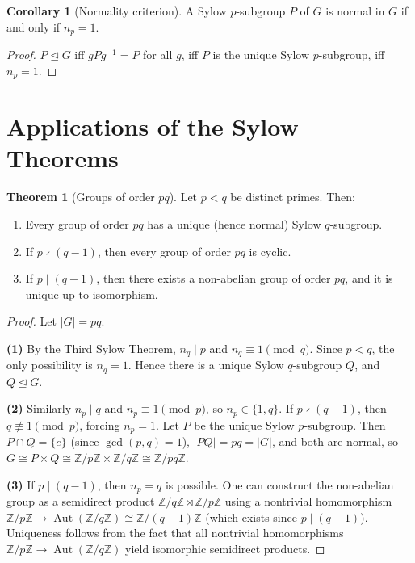 \documentclass[12pt,a4paper,openany]{book}
\theoremstyle{definition}
\newtheorem{theorem}{Theorem}[chapter]
\newtheorem{corollary}{Corollary}[chapter]
\theoremstyle{remark}
\newcommand{\Z}{\mathbb{Z}}
\DeclareMathOperator{\Aut}{Aut}
\renewcommand{\gcd}{\operatorname{gcd}}
\begin{document}
\begin{corollary}[Normality criterion]\label{cor:sylow-normal}
A Sylow $p$-subgroup $P$ of $G$ is normal in $G$ if and only if
$n_p=1$.
\end{corollary}

\begin{proof}
$P\trianglelefteq G$ iff $gPg^{-1}=P$ for all $g$, iff $P$ is the
unique Sylow $p$-subgroup, iff $n_p=1$.
\end{proof}

\section{Applications of the Sylow Theorems}\label{sec:sylow-applications}

\begin{theorem}[Groups of order $pq$]\label{thm:order-pq}
Let $p<q$ be distinct primes.  Then:
\begin{enumerate}
\item Every group of order $pq$ has a unique (hence normal) Sylow
      $q$-subgroup.
\item If $p\nmid(q-1)$, then every group of order $pq$ is cyclic.
\item If $p\mid(q-1)$, then there exists a non-abelian group of
      order $pq$, and it is unique up to isomorphism.
\end{enumerate}
\end{theorem}

\begin{proof}
Let $|G|=pq$.

\textbf{(1)}  By the Third Sylow Theorem, $n_q\mid p$ and
$n_q\equiv 1\pmod{q}$.  Since $p<q$, the only possibility is
$n_q=1$.  Hence there is a unique Sylow $q$-subgroup $Q$, and
$Q\trianglelefteq G$.

\textbf{(2)}  Similarly $n_p\mid q$ and $n_p\equiv 1\pmod{p}$, so
$n_p\in\{1,q\}$.  If $p\nmid(q-1)$, then $q\not\equiv 1\pmod{p}$,
forcing $n_p=1$.  Let $P$ be the unique Sylow $p$-subgroup.
Then $P\cap Q=\{e\}$ (since $\gcd(p,q)=1$), $|PQ|=pq=|G|$, and both
are normal, so $G\cong P\times Q\cong\Z/p\Z\times\Z/q\Z\cong\Z/pq\Z$.

\textbf{(3)}  If $p\mid(q-1)$, then $n_p=q$ is possible.  One can
construct the non-abelian group as a semidirect product
$\Z/q\Z\rtimes\Z/p\Z$ using a nontrivial homomorphism
$\Z/p\Z\to\Aut(\Z/q\Z)\cong\Z/(q-1)\Z$ (which exists since
$p\mid(q-1)$).  Uniqueness follows from the fact that all nontrivial
homomorphisms $\Z/p\Z\to\Aut(\Z/q\Z)$ yield isomorphic semidirect
products.
\end{proof}
\end{document}
